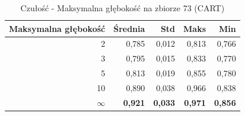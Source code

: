 \begin{table}[htbp]
\centering
\small
\setlength{\tabcolsep}{6pt}
\renewcommand{\arraystretch}{1.2}
\caption{Czułość - Maksymalna głębokość na zbiorze 73 (CART)}
\label{tab:CART_max_depth_73_recall}
\begin{tabular}{r|r|r|r|r}
\toprule
Maksymalna głębokość & Średnia & Std & Maks & Min \\
\hline
2 & 0,785 & 0,012 & 0,813 & 0,766 \\
3 & 0,795 & 0,015 & 0,833 & 0,770 \\
5 & 0,813 & 0,019 & 0,855 & 0,780 \\
10 & 0,890 & 0,038 & 0,966 & 0,838 \\
\textbf{$\infty$} & \textbf{0,921} & \textbf{0,033} & \textbf{0,971} & \textbf{0,856} \\
\bottomrule
\end{tabular}
\end{table}